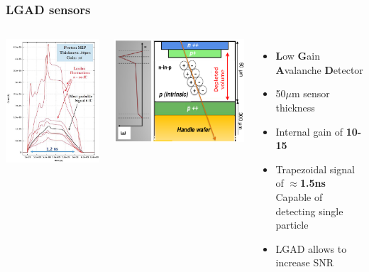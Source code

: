 \documentclass[aspectratio=169]{beamer}
\begin{document}
	
	\begin{frame}
	\frametitle{LGAD sensors}
	\begin{columns}
		\begin{center}	
			\includegraphics[width=0.9 \textwidth]{IMG/LGAD_Signal.PNG}
		\end{center}
	\begin{center}
		\includegraphics[width=0.4 \textwidth]{IMG/UFSDLGAD.PNG}
	\end{center}
		\begin{itemize}
			\item \textbf{L}ow \textbf{G}ain \textbf{A}valanche \textbf{D}etector
			\item 50$\mu$m sensor thickness
			\item Internal gain of \textbf{10-15} 
			\item Trapezoidal signal of $\approx$\textbf{1.5ns}\newline
				{\color{blue} Capable of detecting single particle }
			\item LGAD allows to increase SNR 
		\end{itemize}
	\end{columns}
	\end{frame}
\end{document}
